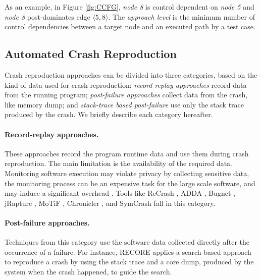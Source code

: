 %
As an example, in Figure \ref{fig:CCFG}, \textit{node 8} is control dependent on \textit{node 5} and \textit{node 8} post-dominates edge $\langle 5,8\rangle$. %
The \textit{approach level} is the minimum number of control dependencies between a target node and an executed path by a test case. 


\subsection{Automated Crash Reproduction}

Crash reproduction approaches can be divided into three categories, based on the kind of data used for crash reproduction: \emph{record-replay approaches} record data from the running program; \emph{post-failure approaches} collect data from the crash, like memory dump; and \emph{stack-trace based post-failure} use only the stack trace produced by the crash. We briefly describe each category hereafter.

\paragraph{Record-replay approaches.}

These approaches record the program runtime data and use them during crash reproduction. The main limitation is the availability of the required data. Monitoring software execution may violate privacy by collecting sensitive data, the monitoring process can be an expensive task for the large scale software, and may induce a significant overhead \cite{Chen2015, Nayrolles2017, Rossler2013}.
%
Tools like \textrm{ReCrash} \cite{Artzi2008}, \textrm{ADDA} \cite{Clause2007}, \textrm{Bugnet} \cite{Narayanasamy2005}, \textrm{jRapture} \cite{Steven2000}, \textrm{MoTiF} \cite{Gomez2016}, \textrm{Chronicler} \cite{Bell2013}, and \textrm{SymCrash} \cite{Cao2014} fall in this category.


\paragraph{Post-failure approaches.}

Techniques from this category use the software data collected directly after the occurrence of a failure. For instance, \textrm{RECORE} \cite{Rossler2013} applies a search-based approach to reproduce a crash by using the stack trace and a core dump, produced by the system when the crash happened, to guide the search.


